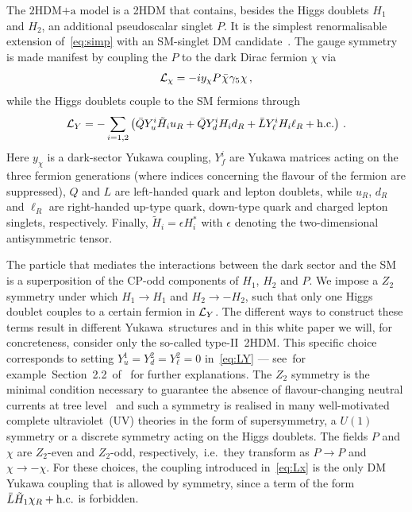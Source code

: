 \documentclass[review]{elsarticle}
\newcommand{\hdma}{\ensuremath{\textrm{2HDM+a}}\xspace}
\begin{document}
The \hdma model is a 2HDM that contains, besides the Higgs doublets $H_1$ and $H_2$, an additional pseudoscalar singlet $P$. It is the simplest renormalisable extension of~\eqref{eq:simp} with an SM-singlet DM candidate~\cite{Ipek:2014gua,No:2015xqa,Goncalves:2016iyg,Bauer:2017ota,Tunney:2017yfp}. The gauge symmetry is made manifest by coupling the $P$ to the dark Dirac fermion  $\chi$ via
\begin{equation} \label{eq:Lx}
{\cal L}_\chi = - i y_\chi P \hspace{0.25mm} \bar \chi \hspace{0.25mm} \gamma_5 \hspace{0.1mm} \chi \,,
\end{equation}
while the Higgs doublets couple to the SM fermions through
\begin{equation} \label{eq:LY}
{\cal L}_{Y} = - \sum_{i=1,2} \left ( \bar Q Y_u^i \tilde H_i u_R  + \bar Q Y_d^i H_i d_R   + \bar L Y_\ell^i H_i \ell_R  + {\rm h.c.}  \right ) \,.
\end{equation}
Here $y_\chi$ is a dark-sector Yukawa coupling, $Y_f^i$ are Yukawa matrices acting on the three fermion generations (where indices concerning the flavour of the fermion are suppressed), $Q$ and $L$ are left-handed quark and lepton doublets, while $u_R$, $d_R$ and $\ell_R$ are right-handed up-type quark, down-type quark and charged lepton singlets, respectively. Finally, $\tilde H_i = \epsilon H_i^\ast$ with $\epsilon$ denoting the  two-dimensional antisymmetric tensor.

The particle that mediates the interactions between the dark sector and the SM is a superposition of the CP-odd components of $H_1$, $H_2$ and $P$. We impose a $Z_2$ symmetry under which $H_1\to H_1$ and $H_2\to -H_2$, such that only one Higgs doublet couples to a certain fermion in ${\cal L}_{Y}$. The different ways to construct these terms result in different Yukawa~structures and in this white paper we will, for concreteness, consider only the so-called type-II~2HDM. This specific choice corresponds to setting $Y_u^1  = Y_d^2 = Y_\ell^2 =0$ in~\eqref{eq:LY} --- see~for example~Section~2.2~of~\cite{Bauer:2017ota} for further explanations.  The $Z_2$ symmetry is the minimal condition necessary to guarantee the absence of flavour-changing neutral currents at tree level~\cite{Glashow:1976nt,Paschos:1976ay} and such a symmetry is realised in many well-motivated complete ultraviolet~(UV) theories in the form of supersymmetry, a $U(1)$ symmetry or  a discrete symmetry acting on the Higgs doublets. The fields $P$ and $\chi$ are $Z_2$-even and $Z_2$-odd, respectively,~i.e.~they transform as $P \to P$ and $\chi \to -\chi$. For these choices, the coupling introduced in~\eqref{eq:Lx} is the only DM Yukawa coupling that is allowed by symmetry, since  a term of the form $\bar L  \tilde H_1 \chi_R + {\rm h.c.}$ is forbidden. 
\end{document}
